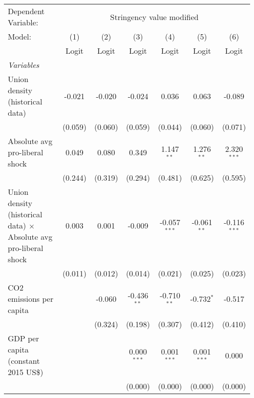 
\begingroup
\centering
\begin{tabular}{lcccccc}
   \toprule
   Dependent Variable: & \multicolumn{6}{c}{Stringency value modified}\\
   Model:                                                                   & (1)     & (2)     & (3)           & (4)            & (5)           & (6)\\  
                                                                            &  Logit  & Logit   & Logit         & Logit          & Logit         & Logit\\  
   \midrule
   \emph{Variables}\\
   Union density (historical data)                                          & -0.021  & -0.020  & -0.024        & 0.036          & 0.063         & -0.089\\   
                                                                            & (0.059) & (0.060) & (0.059)       & (0.044)        & (0.060)       & (0.071)\\   
   Absolute avg pro-liberal shock                                           & 0.049   & 0.080   & 0.349         & 1.147$^{**}$   & 1.276$^{**}$  & 2.320$^{***}$\\   
                                                                            & (0.244) & (0.319) & (0.294)       & (0.481)        & (0.625)       & (0.595)\\   
   Union density (historical data) $\times$ Absolute avg pro-liberal shock  & 0.003   & 0.001   & -0.009        & -0.057$^{***}$ & -0.061$^{**}$ & -0.116$^{***}$\\   
                                                                            & (0.011) & (0.012) & (0.014)       & (0.021)        & (0.025)       & (0.023)\\   
   CO2 emissions per capita                                                 &         & -0.060  & -0.436$^{**}$ & -0.710$^{**}$  & -0.732$^{*}$  & -0.517\\   
                                                                            &         & (0.324) & (0.198)       & (0.307)        & (0.412)       & (0.410)\\   
   GDP per capita (constant 2015 US\$)                                      &         &         & 0.000$^{***}$ & 0.001$^{***}$  & 0.001$^{***}$ & 0.000\\   
                                                                            &         &         & (0.000)       & (0.000)        & (0.000)       & (0.000)\\   

\end{tabular}
